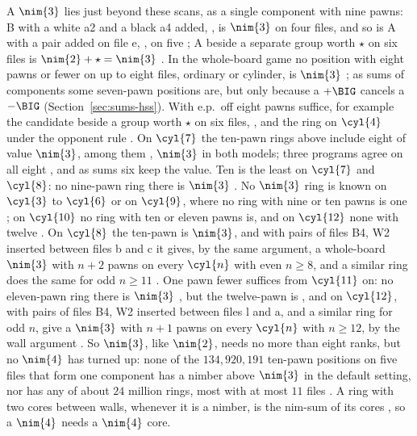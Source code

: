 A $\nim{3}$ lies just beyond these scans, as a single component with nine pawns: B with a white a2 and a black a4 added, , is $\nim{3}$ on four
files, and so is A with a pair added on file e, , on five ; A beside a separate group worth
$\star$ on six files is $\nim{2}+\star=\nim{3}$ . In the whole-board game no position with eight pawns or
fewer on up to eight files, ordinary or cylinder, is $\nim{3}$ ; as sums of components some seven-pawn positions are, but only because a $+\BIG$
cancels a $-\BIG$ (Section~\ref{sec:sums-hss}). With e.p.\ off eight pawns suffice, for example the candidate
beside a group worth $\star$ on six files, , and the ring  on $\cyl{4}$ under the opponent rule . On $\cyl{7}$ the ten-pawn rings above include
eight of value $\nim{3}$, among them , $\nim{3}$ in both models;
three programs agree on all eight , and as sums six keep the value. Ten is the least on $\cyl{7}$ and $\cyl{8}$: no nine-pawn ring there is $\nim{3}$ . No $\nim{3}$ ring is known on $\cyl{3}$ to $\cyl{6}$ or on $\cyl{9}$, where no ring with nine or ten pawns is one ; on $\cyl{10}$ no ring with ten or eleven pawns is, and on $\cyl{12}$ none with twelve . On $\cyl{8}$ the ten-pawn  is $\nim{3}$, and with pairs of files B4, W2
inserted between files b and c it gives, by the same argument, a whole-board $\nim{3}$ with $n+2$ pawns on every
$\cyl{n}$ with even $n\ge8$, and a similar ring does the same for odd $n\ge11$ . One pawn fewer
suffices from $\cyl{11}$ on: no eleven-pawn ring there is $\nim{3}$ , but the twelve-pawn
 is , and  on $\cyl{12}$, with pairs of files B4, W2 inserted between files l and a, and a similar ring for odd $n$,
give a $\nim{3}$ with $n+1$ pawns on every $\cyl{n}$ with $n\ge12$, by the wall argument . So $\nim{3}$, like $\nim{2}$, needs no more than eight ranks, but no $\nim{4}$ has turned up: none of
the $134{,}920{,}191$ ten-pawn positions on five files that form one component has a nimber above $\nim{3}$
in the default setting, nor has any of about $24$ million rings, most with at most $11$ files . A ring with two
cores between walls, whenever it is a nimber, is the nim-sum of its cores , so a $\nim{4}$ needs a
$\nim{4}$ core.

